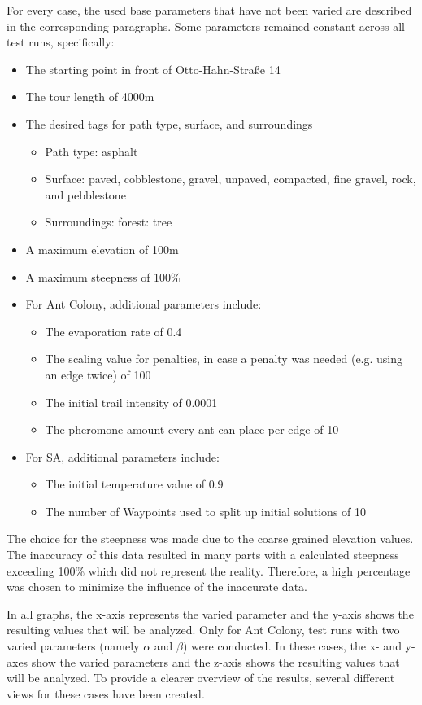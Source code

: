 For every case, the used base parameters that have not been varied are described in the corresponding paragraphs.
Some parameters remained constant across all test runs, specifically:

\begin{itemize}
	\item The starting point in front of Otto-Hahn-Straße 14
	\item The tour length of 4000m
	\item The desired tags for path type, surface, and surroundings
	\begin{itemize}
		\item Path type: asphalt
		\item Surface: paved, cobblestone, gravel, unpaved, compacted, fine gravel, rock, and pebblestone
		\item Surroundings: forest: tree
	\end{itemize}
	\item A maximum elevation of 100m
	\item A maximum steepness of 100\% 
	\item For Ant Colony, additional parameters include:
	\begin{itemize}
		\item The evaporation rate of 0.4
		\item The scaling value for penalties, in case a penalty was needed (e.g. using an edge twice) of 100
		\item The initial trail intensity of 0.0001
		\item The pheromone amount every ant can place per edge of 10
	\end{itemize}
	\item For SA, additional parameters include: 
	\begin{itemize}
		\item The initial temperature value of 0.9
		\item The number of Waypoints used to split up initial solutions of 10
	\end{itemize}
\end{itemize}

The choice for the steepness was made due to the coarse grained elevation values.
The inaccuracy of this data resulted in many parts with a calculated steepness exceeding 100\% which did not represent the reality.
Therefore, a high percentage was chosen to minimize the influence of the inaccurate data.

In all graphs, the x-axis represents the varied parameter and the y-axis shows the resulting values that will be analyzed.
Only for Ant Colony, test runs with two varied parameters (namely $\alpha$ and $\beta$) were conducted.
In these cases, the x- and y-axes show the varied parameters and the z-axis shows the resulting values that will be analyzed.
To provide a clearer overview of the results, several different views for these cases have been created.


